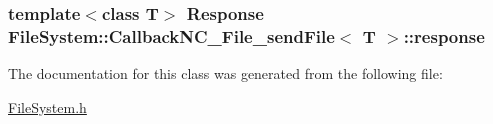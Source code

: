 \subsubsection[{response}]{\setlength{\rightskip}{0pt plus 5cm}template$<$class T$>$ {\bf Response} {\bf File\+System\+::\+Callback\+N\+C\+\_\+\+File\+\_\+send\+File}$<$ T $>$\+::response}\label{class_file_system_1_1_callback_n_c___file__send_file_a162fe4aa10743079f5dcc3afce72467d}


The documentation for this class was generated from the following file\+:\begin{DoxyCompactItemize}
\item 
\hyperlink{_file_system_8h}{File\+System.\+h}\end{DoxyCompactItemize}
